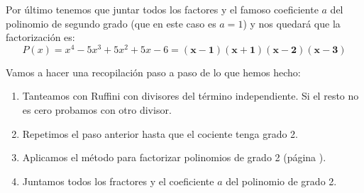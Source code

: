 \documentclass[a4paper,11pt,answers]{exam}
\begin{document}
Por último tenemos que juntar todos los factores y el famoso coeficiente $a$ del polinomio de segundo grado (que en este caso es $a=1$) y nos quedará que la factorización es:
\[P(x) = x^4 - 5x^3 + 5x^2 + 5x -6 = \boldsymbol{(x-1)(x+1)(x-2)(x-3)}\]

Vamos a hacer una recopilación paso a paso  de lo que hemos hecho:
\begin{enumerate}
\item Tanteamos con Ruffini con divisores del término independiente. Si el
  resto no es cero probamos con otro divisor.
\item Repetimos el paso anterior hasta que el cociente tenga grado 2.
\item Aplicamos el método para factorizar polinomios de grado 2 (página \pageref{factor_segundo_grado}).
\item Juntamos todos los fractores y el coeficiente $a$ del polinomio de grado 2.
\end{enumerate}
\end{document}
